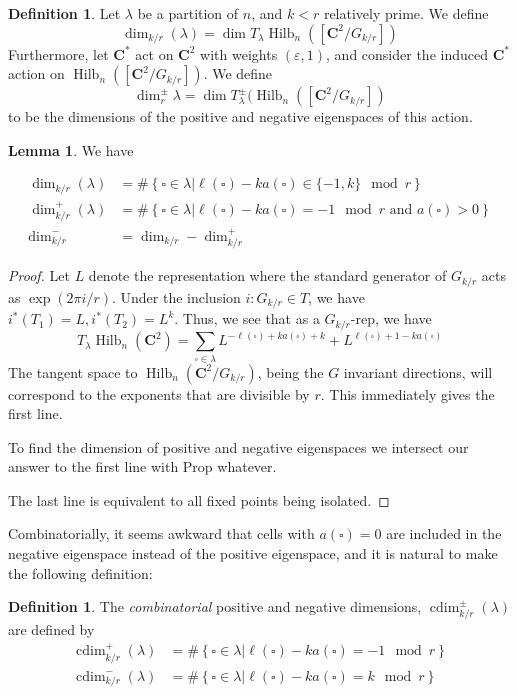\documentclass{amsart}[12pt]
\theoremstyle{definition}
\newtheorem{lemma}[dummy]{Lemma}
\newtheorem{definition}[dummy]{Definition}
\newcommand{\C}{\mathbf{C}}
\DeclareMathOperator{\Hilb}{Hilb}
\DeclareMathOperator{\cdim}{cdim}
\begin{document}
\begin{definition}
Let $\lambda$ be a partition of $n$, and $k<r$ relatively prime.  We define 
\[\dim_{k/r}(\lambda)=\dim T_\lambda\Hilb_n([\C^2/G_{k/r}])\]
Furthermore, let $\C^*$ act on $\C^2$ with weights $(\varepsilon, 1)$, and consider the induced $\C^*$ action on $\Hilb_n([\C^2/G_{k/r}])$.  We define 
\[\dim^{\pm}_r \lambda =\dim T^\pm_\lambda(\Hilb_n([\C^2/G_{k/r}])\]
to be the dimensions of the positive and negative eigenspaces of this action. 
\end{definition}

\begin{lemma} We have

\begin{align*}
\dim_{k/r}(\lambda)&=\#\left\{\square\in\lambda \Big | \ell(\square)-k a(\square)\in\{-1,k\} \mod r\right\} \\
\dim^+_{k/r}(\lambda)& =\#\left\{\square\in\lambda \Big | \ell(\square)-k a(\square)=-1 \mod r \text{ and } a(\square)>0\right\} \\
\dim^-_{k/r} &= \dim_{k/r}-\dim^+_{k/r}
\end{align*}
\end{lemma}
\begin{proof}
Let $L$ denote the representation where the standard generator of $G_{k/r}$ acts as $\exp(2\pi i/r)$. Under the inclusion $i:G_{k/r}\in T$, we have $i^*(T_1)=L, i^*(T_2)=L^k$.  Thus, we see that as a $G_{k/r}$-rep, we have
$$T_\lambda \Hilb_n(\C^2)=\sum_{\square\in\lambda} L^{-\ell(\square)+ka(\square)+k}+L^{\ell(\square)+1-ka(\square)}$$
The tangent space to $\Hilb_n(\C^2/G_{k/r})$, being the $G$ invariant directions, will correspond to the exponents that are divisible by $r$.  This immediately gives the first line.

To find the dimension of positive and negative eigenspaces  we intersect our answer to the first line with Prop whatever.

The last line is equivalent to all fixed points being isolated.
\end{proof}

Combinatorially, it seems awkward that cells with $a(\square)=0$ are included in the negative eigenspace instead of the positive eigenspace, and it is natural to make the following definition:
\begin{definition}
The \emph{combinatorial} positive and negative dimensions, $\cdim^\pm_{k/r}(\lambda)$ are defined by
\begin{align*}
\cdim^+_{k/r}(\lambda)&=\#\left\{\square\in\lambda \Big | \ell(\square)-k a(\square)=-1 \mod r\right\} \\
\cdim^-_{k/r}(\lambda)&=\#\left\{\square\in\lambda \Big | \ell(\square)-k a(\square)=k \mod r\right\} \\
\end{align*}
\end{definition}
\end{document}
